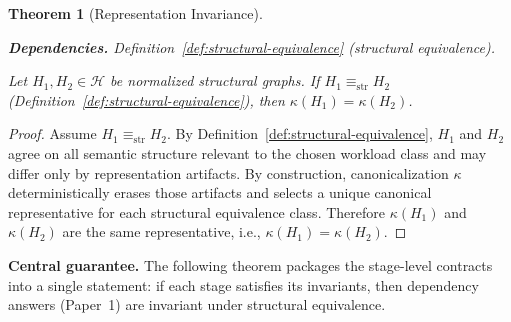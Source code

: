 \documentclass[11pt]{article}
\newtheorem{theorem}{Theorem}
\newcommand{\deps}[1]{\par\noindent\textbf{Dependencies.} #1\par}
\begin{document}
\begin{theorem}[Representation Invariance]
\label{thm:representation-invariance}
\deps{Definition~\ref{def:structural-equivalence} (structural equivalence).}
Let $H_1,H_2\in\mathcal H$ be normalized structural graphs.
If $H_1 \equiv_{\mathrm{str}} H_2$ (Definition~\ref{def:structural-equivalence}), then $\kappa(H_1)=\kappa(H_2)$.
\end{theorem}
\begin{proof}
Assume $H_1 \equiv_{\mathrm{str}} H_2$.
By Definition~\ref{def:structural-equivalence}, $H_1$ and $H_2$ agree on all semantic structure relevant to the chosen workload class and may differ only by representation artifacts.
By construction, canonicalization $\kappa$ deterministically erases those artifacts and selects a unique canonical representative for each structural equivalence class.
Therefore $\kappa(H_1)$ and $\kappa(H_2)$ are the same representative, i.e., $\kappa(H_1)=\kappa(H_2)$.
\end{proof}

\medskip
\noindent\textbf{Central guarantee.} The following theorem packages the stage-level contracts into a single statement: if each stage satisfies its invariants, then dependency answers (Paper~1) are invariant under structural equivalence.
\end{document}
